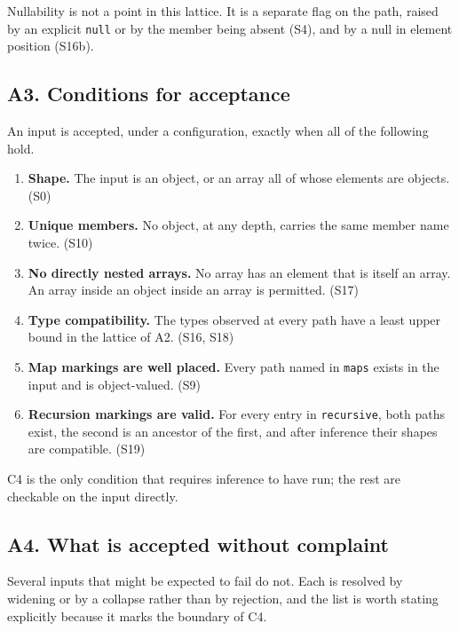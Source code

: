 Nullability is not a point in this lattice. It is a separate flag on the path,
raised by an explicit \texttt{null} or by the member being absent (S4), and by
a null in element position (S16b).

\subsection*{A3. Conditions for acceptance}

An input is accepted, under a configuration, exactly when all of the following
hold.

\begin{enumerate}[label=\textbf{C\arabic*.}]
  \item \textbf{Shape.} The input is an object, or an array all of whose
        elements are objects. \hfill (S0)
  \item \textbf{Unique members.} No object, at any depth, carries the same
        member name twice. \hfill (S10)
  \item \textbf{No directly nested arrays.} No array has an element that is
        itself an array. An array inside an object inside an array is
        permitted. \hfill (S17)
  \item \textbf{Type compatibility.} The types observed at every path have a
        least upper bound in the lattice of A2. \hfill (S16, S18)
  \item \textbf{Map markings are well placed.} Every path named in
        \texttt{maps} exists in the input and is object-valued.
        \hfill (S9)
  \item \textbf{Recursion markings are valid.} For every entry in
        \texttt{recursive}, both paths exist, the second is an ancestor of the
        first, and after inference their shapes are compatible.
        \hfill (S19)
\end{enumerate}

\noindent
C4 is the only condition that requires inference to have run; the rest are
checkable on the input directly.

\subsection*{A4. What is accepted without complaint}

Several inputs that might be expected to fail do not. Each is resolved by
widening or by a collapse rather than by rejection, and the list is worth
stating explicitly because it marks the boundary of C4.


